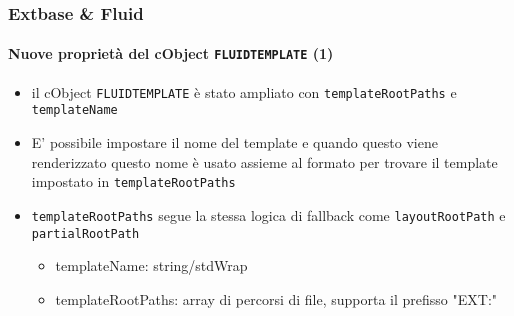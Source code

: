 \begin{frame}[fragile]
	\frametitle{Extbase \& Fluid}
	\framesubtitle{Nuove proprietà del cObject \texttt{FLUIDTEMPLATE} (1)}

	\begin{itemize}

		\item il cObject \texttt{FLUIDTEMPLATE} è stato ampliato con
			\texttt{templateRootPaths} e \texttt{templateName}

		\item E' possibile impostare il nome del template e quando questo viene renderizzato
			questo nome è usato assieme al formato per trovare il template impostato in 
			\texttt{templateRootPaths}

		\item \texttt{templateRootPaths} segue la stessa logica di fallback come
			\texttt{layoutRootPath} e \texttt{partialRootPath}

			\begin{itemize}
				\item templateName: string/stdWrap
				\item templateRootPaths: array di percorsi di file, supporta il prefisso "EXT:"
			\end{itemize}

	\end{itemize}

\end{frame}


